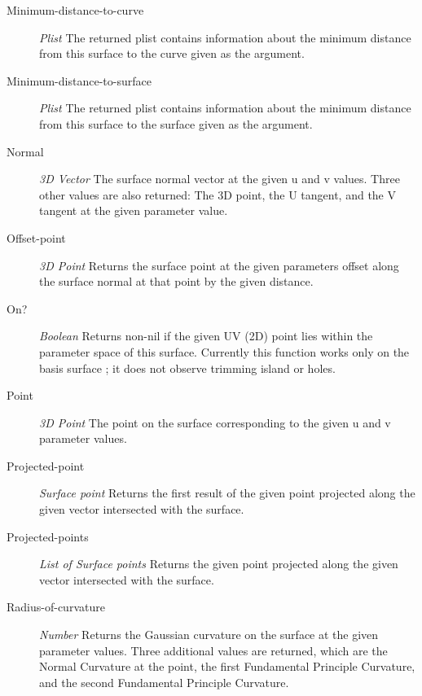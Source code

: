 \documentclass [11pt]{book}
\begin{document}
\begin{itemize}
\begin{description}
\item [Minimum-distance-to-curve]
\emph{Plist} The returned plist contains information about the minimum
distance from this surface to the curve given as the argument.


\item [Minimum-distance-to-surface]
\emph{Plist} The returned plist contains information about the minimum
distance from this surface to the surface given as the argument.


\item [Normal]
\emph{3D Vector} The surface normal vector at the given u and v values.
Three other values are also returned:
The 3D point, the U tangent, and the V tangent at the given parameter value.


\item [Offset-point]
\emph{3D Point} Returns the surface point at the given parameters offset
along the surface normal at that point by the given distance.


\item [On?]
\emph{Boolean} Returns non-nil if the given UV (2D) point lies within the
parameter space of this surface. Currently
this function works only on the basis surface ; it does not observe
trimming island or holes.


\item [Point]
\emph{3D Point} The point on the surface corresponding to the given u and v
parameter values.


\item [Projected-point]
\emph{Surface point} Returns the first result of the given point projected
along the given vector intersected with the surface.


\item [Projected-points]
\emph{List of Surface points} Returns the given point projected along
the given vector intersected with the surface.


\item [Radius-of-curvature]
\emph{Number} Returns the Gaussian curvature on the surface at the given
parameter values. Three additional values are returned, which are the Normal
Curvature at the point, the first Fundamental Principle Curvature, and the
second Fundamental Principle Curvature.



\end{description}
\end{itemize}
\end{document}
